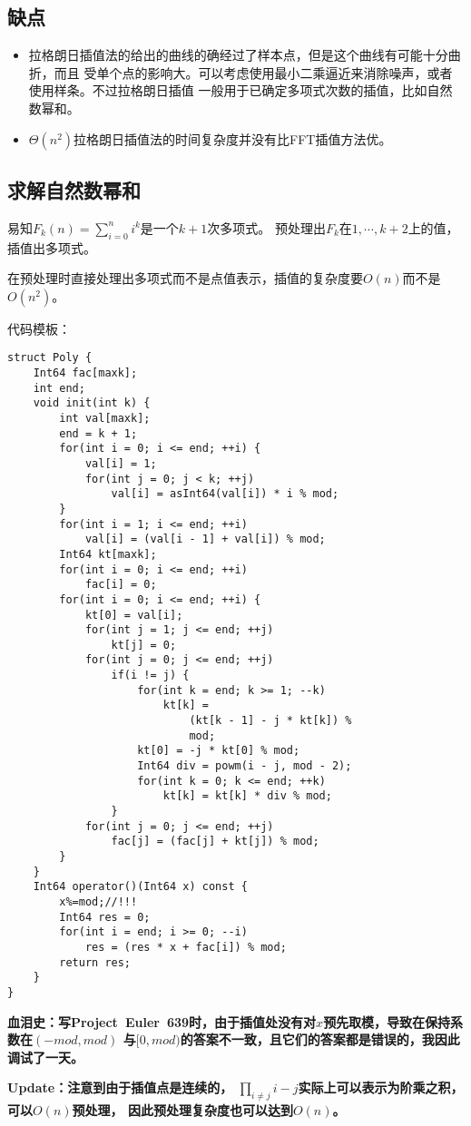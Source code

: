 \subsection{缺点}
\begin{itemize}
    \item 拉格朗日插值法的给出的曲线的确经过了样本点，但是这个曲线有可能十分曲折，而且
    受单个点的影响大。可以考虑使用最小二乘逼近来消除噪声，或者使用样条。不过拉格朗日插值
    一般用于已确定多项式次数的插值，比如自然数幂和。
    \item $\Theta(n^2)$拉格朗日插值法的时间复杂度并没有比FFT插值方法优。
\end{itemize}
\subsection{求解自然数幂和}\label{psum}
易知$F_k(n)=\displaystyle \sum_{i=0}^n{i^k}$是一个$k+1$次多项式。
预处理出$F_k$在$1,\cdots,k+2$上的值，插值出多项式。

在预处理时直接处理出多项式而不是点值表示，插值的复杂度要$O(n)$而不是$O(n^2)$。

代码模板：
\begin{lstlisting}
struct Poly {
    Int64 fac[maxk];
    int end;
    void init(int k) {
        int val[maxk];
        end = k + 1;
        for(int i = 0; i <= end; ++i) {
            val[i] = 1;
            for(int j = 0; j < k; ++j)
                val[i] = asInt64(val[i]) * i % mod;
        }
        for(int i = 1; i <= end; ++i)
            val[i] = (val[i - 1] + val[i]) % mod;
        Int64 kt[maxk];
        for(int i = 0; i <= end; ++i)
            fac[i] = 0;
        for(int i = 0; i <= end; ++i) {
            kt[0] = val[i];
            for(int j = 1; j <= end; ++j)
                kt[j] = 0;
            for(int j = 0; j <= end; ++j)
                if(i != j) {
                    for(int k = end; k >= 1; --k)
                        kt[k] =
                            (kt[k - 1] - j * kt[k]) %
                            mod;
                    kt[0] = -j * kt[0] % mod;
                    Int64 div = powm(i - j, mod - 2);
                    for(int k = 0; k <= end; ++k)
                        kt[k] = kt[k] * div % mod;
                }
            for(int j = 0; j <= end; ++j)
                fac[j] = (fac[j] + kt[j]) % mod;
        }
    }
    Int64 operator()(Int64 x) const {
        x%=mod;//!!!
        Int64 res = 0;
        for(int i = end; i >= 0; --i)
            res = (res * x + fac[i]) % mod;
        return res;
    }
}
\end{lstlisting}

{\bfseries 血泪史：写Project~Euler~639时，由于插值处没有对$x$预先取模，导致在保持系数在$(-mod,mod)$
与$[0,mod)$的答案不一致，且它们的答案都是错误的，我因此调试了一天。}

{\bfseries Update：注意到由于插值点是连续的，
$\displaystyle \prod_{i\neq j}{i-j}$实际上可以表示为阶乘之积，可以$O(n)$预处理，
因此预处理复杂度也可以达到$O(n)$。}
